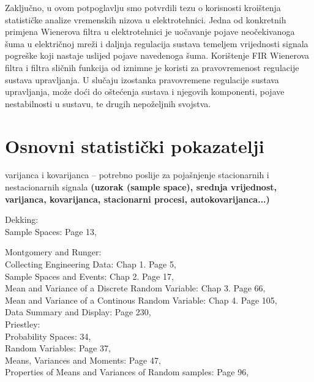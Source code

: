 \documentclass[a4paper,12pt,oneside]{memoir}
\begin{document}
            Zaključno, u ovom potpoglavlju smo potvrdili tezu o korisnosti kroištenja statističke analize vremenskih nizova u elektrotehnici. Jedna od konkretnih primjena Wienerova filtra u elektrotehnici je uočavanje pojave neočekivanoga šuma u električnoj mreži i daljnja regulacija sustava temeljem vrijednosti signala pogreške koji nastaje uslijed pojave navedenoga šuma. Korištenje FIR Wienerova filtra i filtra sličnih funkcija od iznimne je koristi za pravovremenost regulacije sustava upravljanja. U slučaju izostanka pravovremene regulacije sustava upravljanja, može doći do oštećenja sustava i njegovih komponenti, pojave nestabilnosti u sustavu, te drugih nepoželjnih svojstva.



        \section{Osnovni statistički pokazatelji}
            varijanca i kovarijanca -- potrebno poslije za pojašnjenje stacionarnih i nestacionarnih signala
            \textbf{(uzorak (sample space), srednja vrijednost, varijanca, kovarijanca, stacionarni procesi, autokovarijanca...)}

            Dekking:\\
            Sample Spaces: Page 13,


            
            Montgomery and Runger:\\
            Collecting Engineering Data: Chap 1. Page 5,\\
            Sample Spaces and Events: Chap 2. Page 17,\\
            Mean and Variance of a Discrete Random Variable: Chap 3. Page 66,\\
            Mean and Variance of a Continous Random Variable: Chap 4. Page 105,\\
            Data Summary and Display: Page 230,\\


            Priestley:\\
                Probability Spaces: 34,\\
                Random Variables: Page 37,\\
                Means, Variances and Moments: Page 47,\\
                Properties of Means and Variances of Random samples: Page 96,\\
\end{document}
